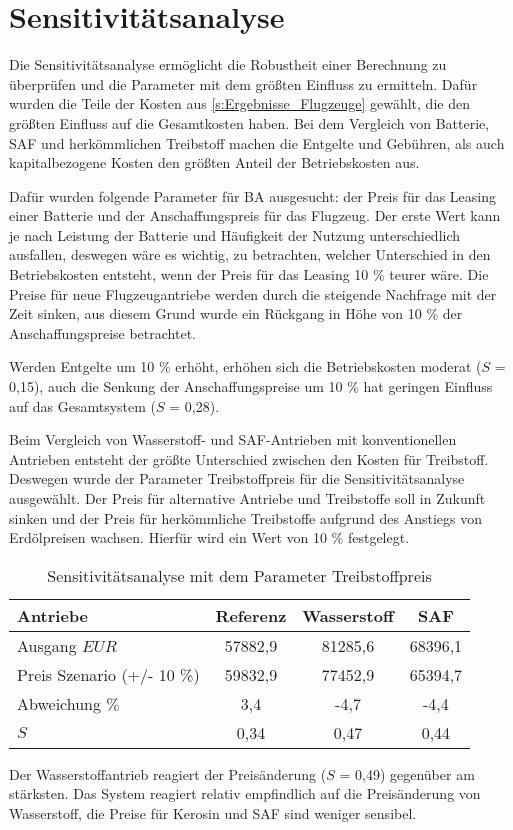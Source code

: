 \section{Sensitivitätsanalyse}
\label{s:Sensitivitätsanalyse}
%
Die Sensitivitätsanalyse ermöglicht die Robustheit einer Berechnung zu überprüfen 
und die Parameter mit dem größten Einfluss zu ermitteln. 
Dafür wurden die Teile der Kosten aus \ref{s:Ergebnisse_Flugzeuge} gewählt, 
die den größten Einfluss auf die Gesamtkosten haben. 
Bei dem Vergleich von Batterie, SAF und herkömmlichen Treibstoff 
machen die Entgelte und Gebühren, als auch kapitalbezogene Kosten den größten Anteil der Betriebskosten aus. %

Dafür wurden folgende Parameter für BA ausgesucht: der Preis für das Leasing einer Batterie 
und der Anschaffungspreis für das Flugzeug.
Der erste Wert kann je nach Leistung der Batterie und Häufigkeit der Nutzung unterschiedlich ausfallen, 
deswegen wäre es wichtig, zu betrachten, welcher Unterschied in den Betriebskosten entsteht, 
wenn der Preis für das Leasing 10 \% teurer wäre. 
Die Preise für neue Flugzeugantriebe werden durch die steigende Nachfrage mit der Zeit sinken, 
aus diesem Grund wurde ein Rückgang in Höhe von 10 \% der Anschaffungspreise betrachtet.

Werden Entgelte um 10 \% erhöht, erhöhen sich die Betriebskosten moderat ($S$ = 0,15), 
auch die Senkung der Anschaffungspreise um 10 \% hat geringen Einfluss auf das Gesamtsystem ($S$ = 0,28).

Beim Vergleich von Wasserstoff- und SAF-Antrieben mit konventionellen Antrieben 
entsteht der größte Unterschied zwischen den Kosten für Treibstoff. 
Deswegen wurde der Parameter \glqq Treibstoffpreis\grqq{} für die Sensitivitätsanalyse ausgewählt.
Der Preis für alternative Antriebe und Treibstoffe soll in Zukunft sinken und der Preis 
für herkömmliche Treibstoffe aufgrund des Anstiegs von Erdölpreisen wachsen. 
Hierfür wird ein Wert von 10 \% festgelegt.
%
\begin{table}[h]
	\begin{center}
    \caption{Sensitivitätsanalyse mit dem Parameter Treibstoffpreis}
	\label{sensiv}
	\begin{tabular}{|l|c|c|c|}
		\hline
		\textbf{Antriebe} & \textbf{Referenz}& \textbf{Wasserstoff}& \textbf{SAF} \\ \hline
		Ausgang $EUR$ & 57882,9 & 81285,6 & 68396,1	\\ \hline
        Preis Szenario (+/- 10 \%) & 59832,9 & 77452,9 & 65394,7\\ \hline
        Abweichung $\%$ & 3,4 & -4,7 & -4,4 \\ \hline
		$S$ & 0,34 & 0,47 & 0,44 \\ \hline
	\end{tabular}
    \end{center}
\end{table}
%
Der Wasserstoffantrieb reagiert der Preisänderung ($S$ = 0,49) gegenüber am stärksten. 
Das System reagiert relativ empfindlich auf die Preisänderung von Wasserstoff, 
die Preise für Kerosin und SAF sind weniger sensibel.
